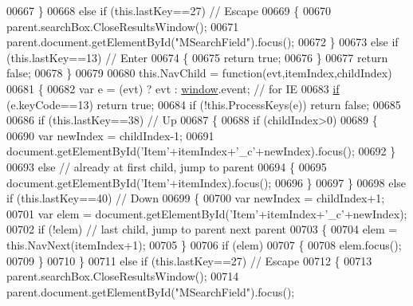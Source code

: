 \begin{DoxyCode}
00667       \}
00668       \textcolor{keywordflow}{else} \textcolor{keywordflow}{if} (this.lastKey==27) \textcolor{comment}{// Escape}
00669       \{
00670         parent.searchBox.CloseResultsWindow();
00671         parent.document.getElementById(\textcolor{stringliteral}{"MSearchField"}).focus();
00672       \}
00673       \textcolor{keywordflow}{else} \textcolor{keywordflow}{if} (this.lastKey==13) \textcolor{comment}{// Enter}
00674       \{
00675         \textcolor{keywordflow}{return} \textcolor{keyword}{true};
00676       \}
00677       \textcolor{keywordflow}{return} \textcolor{keyword}{false};
00678     \}
00679 
00680     this.NavChild = \textcolor{keyword}{function}(evt,itemIndex,childIndex)
00681     \{
00682       var e  = (evt) ? evt : \hyperlink{jquery_8js_a04a8a2bbfa9c15500892b8e5033d625b}{window}.event; \textcolor{comment}{// for IE}
00683       \hyperlink{jquery_8js_a9db6d45a025ad692282fe23e69eeba43}{if} (e.keyCode==13) \textcolor{keywordflow}{return} \textcolor{keyword}{true};
00684       \textcolor{keywordflow}{if} (!this.ProcessKeys(e)) \textcolor{keywordflow}{return} \textcolor{keyword}{false};
00685 
00686       \textcolor{keywordflow}{if} (this.lastKey==38) \textcolor{comment}{// Up}
00687       \{
00688         \textcolor{keywordflow}{if} (childIndex>0)
00689         \{
00690           var newIndex = childIndex-1;
00691           document.getElementById(\textcolor{stringliteral}{'Item'}+itemIndex+\textcolor{stringliteral}{'\_c'}+newIndex).focus();
00692         \}
00693         \textcolor{keywordflow}{else} \textcolor{comment}{// already at first child, jump to parent}
00694         \{
00695           document.getElementById(\textcolor{stringliteral}{'Item'}+itemIndex).focus();
00696         \}
00697       \}
00698       \textcolor{keywordflow}{else} \textcolor{keywordflow}{if} (this.lastKey==40) \textcolor{comment}{// Down}
00699       \{
00700         var newIndex = childIndex+1;
00701         var elem = document.getElementById(\textcolor{stringliteral}{'Item'}+itemIndex+\textcolor{stringliteral}{'\_c'}+newIndex);
00702         \textcolor{keywordflow}{if} (!elem) \textcolor{comment}{// last child, jump to parent next parent}
00703         \{
00704           elem = this.NavNext(itemIndex+1);
00705         \}
00706         \textcolor{keywordflow}{if} (elem)
00707         \{
00708           elem.focus();
00709         \} 
00710       \}
00711       \textcolor{keywordflow}{else} \textcolor{keywordflow}{if} (this.lastKey==27) \textcolor{comment}{// Escape}
00712       \{
00713         parent.searchBox.CloseResultsWindow();
00714         parent.document.getElementById(\textcolor{stringliteral}{"MSearchField"}).focus();

\end{DoxyCode}
